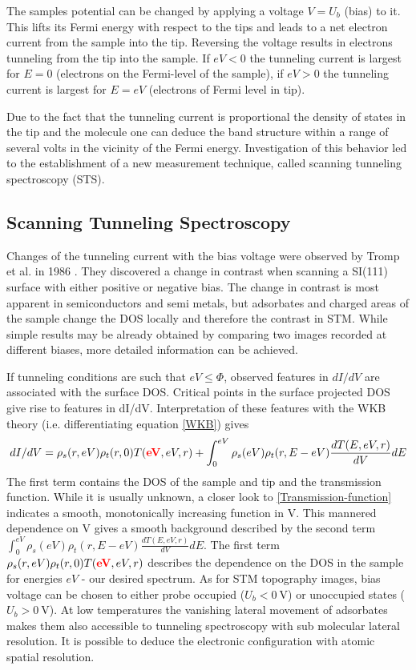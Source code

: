 The samples potential can be changed by applying a voltage $V=U_b$ (bias) to it. This lifts its Fermi energy with respect to the tips and leads to a net electron current from the sample into the tip. Reversing the voltage results in electrons tunneling from the tip into the sample. If $eV<0$ the tunneling current is largest for $E=0$ (electrons on the Fermi-level of the sample), if $eV>0$ the tunneling current is largest for $E=eV$ (electrons of Fermi level in tip).

Due to the fact that the tunneling current is proportional the density of states in the tip and the molecule one can deduce the band structure within a range of several volts in the vicinity of the Fermi energy. Investigation of this behavior led to the establishment of a new measurement technique, called scanning tunneling spectroscopy (STS).

\subsection{\textbf{S}canning \textbf{T}unneling \textbf{S}pectroscopy}
\label{section:STS}
Changes of the tunneling current with the bias voltage were observed by Tromp et al. in 1986 \cite{tromp_atomic_1986}. They discovered a change in contrast when scanning a SI(111) surface with either positive or negative bias. The change in contrast is most apparent in semiconductors and semi metals\cite{bonnell_scanning_1993}, but adsorbates and charged areas of the sample change the DOS locally and therefore the contrast in STM. While simple results may be already obtained by comparing two images recorded at different biases, more detailed information can be achieved.

If tunneling conditions are such that $eV\leq\Phi$, observed features in $dI/dV$ are associated with the surface DOS. Critical points in the surface projected DOS give rise to features in dI/dV. Interpretation of these features with the WKB theory (i.e. differentiating equation \eqref{WKB}) gives
$$dI/dV=\rho_s(r,eV)\rho_t(r,0)T(\textcolor{red}{\textbf{eV}},eV,r)+\int_0^{eV}\rho_s(eV)\rho_t(r,E-eV)\frac{dT(E,eV,r)}{dV}dE$$
The first term contains the DOS of the sample and tip and the transmission function. While it is usually unknown, a closer look to \eqref{Transmission-function} indicates a smooth, monotonically increasing function in V. This mannered dependence on V gives a smooth background described by the second term $\int_0^{eV}\rho_s(eV)\rho_t(r,E-eV)\frac{dT(E,eV,r)}{dV}dE$.
The first term $\rho_s(r,eV)\rho_t(r,0)T(\textcolor{red}{\textbf{eV}},eV,r)$ describes the dependence on the DOS in the sample for energies $eV$ - our desired spectrum. As for STM topography images, bias voltage can be chosen to either probe occupied ($U_b < \SI{0}{\volt}$) or unoccupied states ($U_b > \SI{0}{\volt}$).  At low temperatures the vanishing lateral movement of adsorbates makes them also accessible to tunneling spectroscopy with sub molecular lateral resolution. It is possible to deduce the electronic configuration with atomic spatial resolution.

